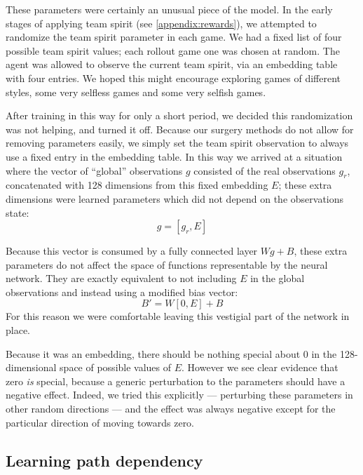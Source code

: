 \documentclass[ocean-paper.tex]{subfiles}
\begin{document}
These parameters were certainly an unusual piece of the model.
In the early stages of applying team spirit (see \autoref{appendix:rewards}), we attempted to randomize the team spirit parameter in each game. 
We had a fixed list of four possible team spirit values; each rollout game one was chosen at random.
The agent was allowed to observe the current team spirit, via an embedding table with four entries.
We hoped this might encourage exploring games of different styles, some very selfless games and some very selfish games.

After training in this way for only a short period, we decided this randomization was not helping, and turned it off.
Because our surgery methods do not allow for removing parameters easily, we simply set the team spirit observation to always use a fixed entry in the embedding table.
In this way we arrived at a situation where the vector of ``global'' observations $g$ consisted of the real observations $g_r$, concatenated with 128 dimensions from this fixed embedding $E$; these extra dimensions were learned parameters which did not depend on the observations state:
\begin{equation}
    g = \left[g_r, E\right]
\end{equation}

Because this vector is consumed by a fully connected layer $Wg+B$, these extra parameters do not affect the space of functions representable by the neural network. They are exactly equivalent to not including $E$ in the global observations and instead using a modified bias vector:
\begin{equation}
    B'=W\left[0, E\right] + B
\end{equation}
For this reason we were comfortable leaving this vestigial part of the network in place.

Because it was an embedding, there should be nothing special about 0 in the 128-dimensional space of possible values of $E$. 
However we see clear evidence that zero \emph{is} special, because a generic perturbation to the parameters should have a negative effect.
Indeed, we tried this explicitly --- perturbing these parameters in other random directions --- and the effect was always negative except for the particular direction of moving towards zero.

\subsection{Learning path dependency}
\end{document}
